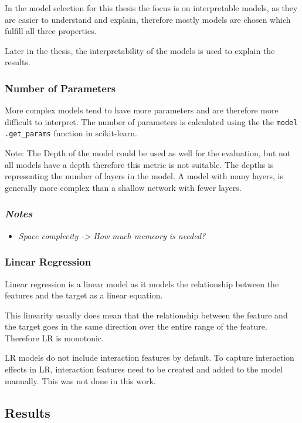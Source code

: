In the model selection for this thesis the focus is on interpretable models,
as they are easier to
understand and explain, therefore mostly models are chosen which fulfill all
three
properties.

Later in the thesis, the interpretability of the models is used to explain
the results.

\subsubsection*{Number of Parameters}
More complex models tend to have more parameters and are therefore more
difficult to interpret.
The number of parameters is calculated using the the \texttt{model
.get\_params} function
in scikit-learn.

Note: The Depth of the model could be used as well for the evaluation, but
not all models have a
depth therefore this metric is not suitable.
The depths is representing the number of layers in the model.
A model with many layers, is generally more complex than a shallow network
with fewer layers.

\subsubsection*{\textit{Notes}}

\begin{itemize}
    \item \textit{Space complecity -> How much memeory is needed?}
\end{itemize}

\subsubsection*{Linear Regression}
Linear regression is a linear model as it models the relationship between the
features and the
target as a linear equation.

This linearity usually does mean that the relationship between the feature
and the target goes in
the same direction over the entire range of the feature. Therefore \ac{LR} is
monotonic.

\ac{LR} models do not include interaction features by default.
To capture interaction effects in \ac{LR}, interaction features need to be
created and added to
the model manually. This was not done in this work.

\subsection{Results}\label{subsec:results2}

